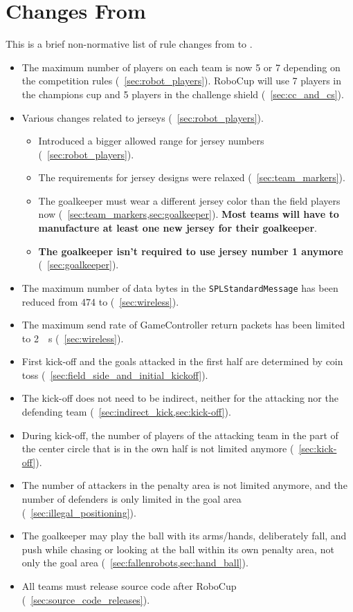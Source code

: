 \section{Changes From \LastRCYear}
This is a brief non-normative list of rule changes from \LastRCYear to \RCYear.

\begin{itemize}
  \item The maximum number of players on each team is now 5 or 7 depending on the competition rules (\cf~\cref{sec:robot_players}). RoboCup \RCYear will use 7 players in the champions cup and 5 players in the challenge shield (\cf~\cref{sec:cc_and_cs}).
  \item Various changes related to jerseys (\cf~\cref{sec:robot_players}).
  \begin{itemize}
    \item Introduced a bigger allowed range for jersey numbers (\cf~\cref{sec:robot_players}).
    \item The requirements for jersey designs were relaxed (\cf~\cref{sec:team_markers}).
    \item The goalkeeper must wear a different jersey color than the field players now (\cf~\cref{sec:team_markers,sec:goalkeeper}). \textbf{Most teams will have to manufacture at least one new jersey for their goalkeeper}.
    \item \textbf{The goalkeeper isn't required to use jersey number 1 anymore} (\cf~\cref{sec:goalkeeper}).
  \end{itemize}
  \item The maximum number of data bytes in the \texttt{SPLStandardMessage} has been reduced from 474 to \TeamMessageDataSize{} (\cf~\cref{sec:wireless}).
  \item The maximum send rate of GameController return packets has been limited to \qty{2}{\per\second} (\cf~\cref{sec:wireless}).
  \item First kick-off and the goals attacked in the first half are determined by coin toss (\cf~\cref{sec:field_side_and_initial_kickoff}).
  \item The kick-off does not need to be indirect, neither for the attacking nor the defending team (\cf~\cref{sec:indirect_kick,sec:kick-off}).
  \item During kick-off, the number of players of the attacking team in the part of the center circle that is in the own half is not limited anymore (\cf~\cref{sec:kick-off}).
  \item The number of attackers in the penalty area is not limited anymore, and the number of defenders is only limited in the goal area (\cf~\cref{sec:illegal_positioning}).
  \item The goalkeeper may play the ball with its arms/hands, deliberately fall, and push while chasing or looking at the ball within its own penalty area, not only the goal area (\cf~\cref{sec:fallenrobots,sec:hand_ball}).
  \item All teams must release source code after RoboCup (\cf~\cref{sec:source_code_releases}).
\end{itemize}
